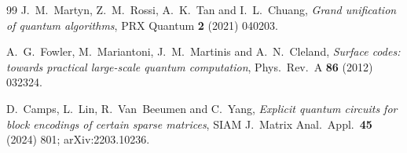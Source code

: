 \documentclass[11pt,a4paper]{article}
\begin{document}
\begin{thebibliography}{99}
J.~M.~Martyn, Z.~M.~Rossi, A.~K.~Tan and I.~L.~Chuang,
\emph{Grand unification of quantum algorithms},
PRX Quantum \textbf{2} (2021) 040203.

A.~G.~Fowler, M.~Mariantoni, J.~M.~Martinis and A.~N.~Cleland,
\emph{Surface codes: towards practical large-scale quantum
computation}, Phys.\ Rev.\ A \textbf{86} (2012) 032324.

D.~Camps, L.~Lin, R.~Van~Beeumen and C.~Yang,
\emph{Explicit quantum circuits for block encodings of certain
sparse matrices}, SIAM J.\ Matrix Anal.\ Appl.\ \textbf{45} (2024)
801; arXiv:2203.10236.

\end{thebibliography}
\end{document}
